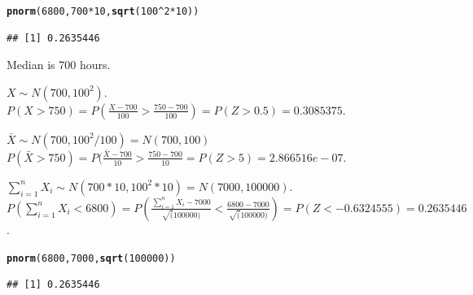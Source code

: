 \documentclass[bigtut]{tutorial}\usepackage[]{graphicx}\usepackage[]{color}
\makeatletter
\newcommand{\hlnum}[1]{\textcolor[rgb]{0.686,0.059,0.569}{#1}}%
\newcommand{\hlopt}[1]{\textcolor[rgb]{0,0,0}{#1}}%
\newcommand{\hlstd}[1]{\textcolor[rgb]{0.345,0.345,0.345}{#1}}%
\newcommand{\hlkwd}[1]{\textcolor[rgb]{0.737,0.353,0.396}{\textbf{#1}}}%
\newenvironment{kframe}{%
 \def\at@end@of@kframe{}%
 \ifinner\ifhmode%
  \def\at@end@of@kframe{\end{minipage}}%
  \begin{minipage}{\columnwidth}%
 \fi\fi%
 \def\FrameCommand##1{\hskip\@totalleftmargin \hskip-\fboxsep
 \colorbox{shadecolor}{##1}\hskip-\fboxsep
     \hskip-\linewidth \hskip-\@totalleftmargin \hskip\columnwidth}%
 \MakeFramed {\advance\hsize-\width
   \@totalleftmargin\z@ \linewidth\hsize
   \@setminipage}}%
 {\par\unskip\endMakeFramed%
 \at@end@of@kframe}
\newenvironment{knitrout}{}{} %
\makeatother
\begin{document}
\begin{tutorial}
\begin{questions}
\begin{parts}
\begin{knitrout}
\color{fgcolor}\begin{kframe}
\begin{alltt}
\hlkwd{pnorm}\hlstd{(}\hlnum{6800}\hlstd{,}\hlnum{700}\hlopt{*}\hlnum{10}\hlstd{,}\hlkwd{sqrt}\hlstd{(}\hlnum{100}\hlopt{^}\hlnum{2}\hlopt{*}\hlnum{10}\hlstd{))}
\end{alltt}
\begin{verbatim}
## [1] 0.2635446
\end{verbatim}
\end{kframe}
\end{knitrout}
\end{parts}

\begin{solution}
\begin{parts}
\item Median is 700 hours.\\

\item
$X \sim N(700,100^2)$. \\
$P(X > 750) = P(\frac{X-700}{100} > \frac{750-700}{100}) = P(Z > 0.5) = 0.3085375$. \\

\item
$\bar{X} \sim N(700, 100^2/100) = N(700,100)$ \\
$P(\bar{X} > 750) = P(\frac{\bar{X}-700}{10} > \frac{750-700}{10} = P(Z > 5) = 2.866516e-07$.  \\

\item
$\sum_{i=1}^{n}{X_{i}} \sim  N(700*10, 100^2*10) = N(7000,100000)$. \\
$P(\sum_{i=1}^{n}{X_{i}} < 6800) = P(\frac{\sum_{i=1}^{n}{X_{i}}-7000}{\sqrt(100000)} < \frac{6800-7000}{\sqrt(100000)}) = P(Z < -0.6324555) = 0.2635446$. \\

\begin{knitrout}
\color{fgcolor}\begin{kframe}
\begin{alltt}
\hlkwd{pnorm}\hlstd{(}\hlnum{6800}\hlstd{,}\hlnum{7000}\hlstd{,}\hlkwd{sqrt}\hlstd{(}\hlnum{100000}\hlstd{))}
\end{alltt}
\begin{verbatim}
## [1] 0.2635446
\end{verbatim}
\end{kframe}
\end{knitrout}


\end{parts}
\end{solution}
\end{questions}
\end{tutorial}
\end{document}
